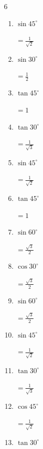 \begin{multicols}{6}
\begin{enumerate}
        $\displaystyle =\frac{\sqrt{3}}{2}$

  \item $\displaystyle \sin{45^\circ}$

        $\displaystyle =\frac{1}{\sqrt{2}}$

  \item $\displaystyle \sin{30^\circ}$

        $\displaystyle =\frac{1}{2}$

  \item $\displaystyle \tan{45^\circ}$

        $\displaystyle =1$

\columnbreak %

  \item $\displaystyle \tan{30^\circ}$

        $\displaystyle =\frac{1}{\sqrt{3}}$

  \item $\displaystyle \sin{45^\circ}$

        $\displaystyle =\frac{1}{\sqrt{2}}$

  \item $\displaystyle \tan{45^\circ}$

        $\displaystyle =1$

  \item $\displaystyle \sin{60^\circ}$

        $\displaystyle =\frac{\sqrt{3}}{2}$

  \item $\displaystyle \cos{30^\circ}$

        $\displaystyle =\frac{\sqrt{3}}{2}$

  \item $\displaystyle \sin{60^\circ}$

        $\displaystyle =\frac{\sqrt{3}}{2}$

  \item $\displaystyle \sin{45^\circ}$

        $\displaystyle =\frac{1}{\sqrt{2}}$

  \item $\displaystyle \tan{30^\circ}$

        $\displaystyle =\frac{1}{\sqrt{3}}$

  \item $\displaystyle \cos{45^\circ}$

        $\displaystyle =\frac{1}{\sqrt{2}}$

  \item $\displaystyle \tan{30^\circ}$


\end{enumerate}
\end{multicols}

